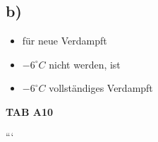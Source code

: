 

\subsection*{b)}
\begin{itemize}
    \item für neue Verdampft
    \item $-6^\circ C$ nicht werden, ist
    \item $-6^\circ C$ vollständiges Verdampft
\end{itemize}

\textbf{TAB A10}

```